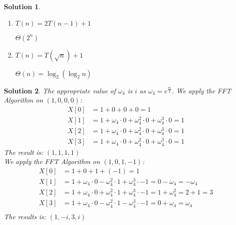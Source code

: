\documentclass[boxes]{rutgers_hw}
\newtheorem*{solutions}{Solution}
\begin{document}
\begin{solutions}
\begin{enumerate}
        \begin{solution}
            $\Theta(n\cdot c^n)$
        \end{solution}
        \item $T(n) = 2T(n - 1) + 1$
        \begin{solution}
            $\Theta(2^n)$
        \end{solution}
        \item $T(n) = T(\sqrt{n}) + 1$
        \begin{solution}
            $\Theta(n) = \log_2{(\log_2{n})}$
        \end{solution}
    \end{enumerate}
\end{solutions}

\pagebreak

\begin{exern}{2.8}
\end{exern}
\begin{solutions}
    The appropriate value of $\omega_4$ is $i$ as $\omega_4 = e^{\frac{{\pi}{i}}2}$.
    We apply the FFT Algorithm on $(1,0,0,0)$:
    \begin{align*}
        X[0] &= 1 + 0 + 0 + 0 = 1 \\
        X[1] &= 1 + \omega_4 \cdot 0 + \omega_4^2 \cdot 0 + \omega_4^3 \cdot 0 = 1 \\
        X[2] &= 1 + \omega_4 \cdot 0 + \omega_4^2 \cdot 0 + \omega_4^3 \cdot 0 = 1 \\
        X[3] &= 1 + \omega_4 \cdot 0 + \omega_4^2 \cdot 0 + \omega_4^3 \cdot 0 = 1
    \end{align*}
    The result is: $\left(1,1,1,1\right)$
    \hfill \break \\

    We apply the FFT Algorithm on $(1,0,1,-1)$:
    \begin{align*}
        X[0] &= 1 + 0 + 1 + (-1) = 1 \\
        X[1] &= 1 + \omega_4 \cdot 0 - \omega_4^2 \cdot 1 + \omega_4^3 \cdot -1 = 0 - \omega_4 = -\omega_4 \\
        X[2] &= 1 + \omega_4 \cdot 0 + \omega_4^2 \cdot 1 + \omega_4^3 \cdot -1 = 1 + \omega_4^2 = 2 + 1 = 3 \\
        X[3] &= 1 + \omega_4 \cdot 0 - \omega_4^2 \cdot 1 - \omega_4^3 \cdot -1 = 0 + \omega_4 = \omega_4 \\
    \end{align*}
    The results is: $\left(1,-i,3,i\right)$
\end{solutions}
\end{document}
